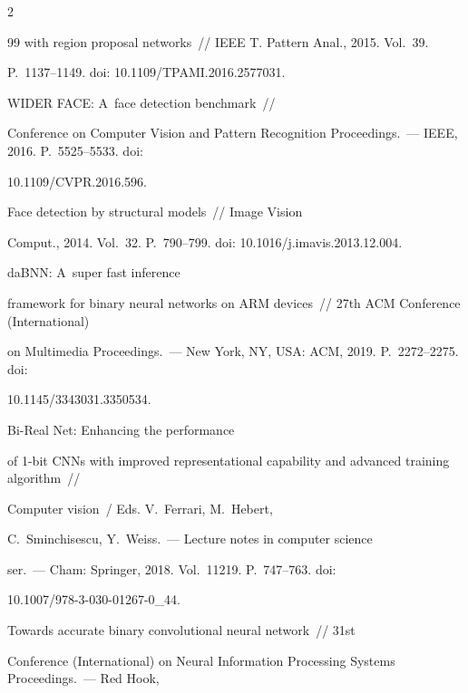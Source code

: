 \begin{multicols}{2}
{{\begin{thebibliography}{99}
with region proposal networks~// IEEE T. Pattern Anal., 2015. Vol.~39. 


P.~1137--1149. doi: 10.1109/\mbox{TPAMI}.2016.2577031.




 WIDER FACE: A~face detection benchmark~//  


Conference on Computer Vision and Pattern Recognition Proceedings.~--- IEEE, 2016. P.~5525--5533. doi: 


10.1109/CVPR.2016.596.







 Face detection by structural models~// Image Vision 


Comput., 2014. Vol.~32. P.~790--799. doi: 10.1016/j.imavis.2013.12.004.




 daBNN: A~super fast inference 


framework for binary neural networks on ARM devices~// 27th ACM Conference (International)  


on Multimedia Proceedings.~--- New York, NY, USA: ACM, 2019. P.~2272--2275. doi: 


10.1145/3343031.3350534.







 Bi-Real Net: Enhancing the performance 


of 1-bit CNNs with improved representational capability and advanced training algorithm~// 


Computer vision~/ Eds. V.~Ferrari, M.~Hebert, 


C.~Sminchisescu, Y.~Weiss.~--- Lecture notes in computer science 


ser.~--- Cham: Springer, 2018. Vol.~11219. P.~747--763. doi:  


10.1007/978-3-030-01267-0\_44.




 Towards accurate binary convolutional neural network~// 31st  


Conference (International) on Neural Information Processing Systems Proceedings.~--- Red Hook, 



\end{thebibliography}}}
\end{multicols}
